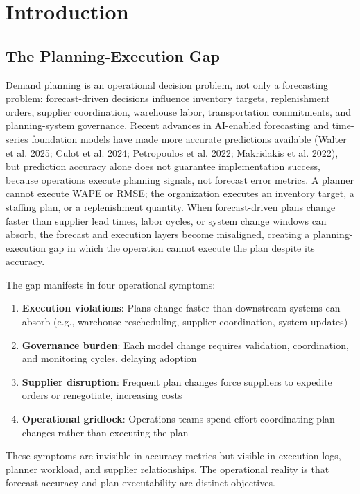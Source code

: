 \section{Introduction}

\subsection{The Planning-Execution Gap}
\label{sec:gap}

Demand planning is an operational decision problem, not only a forecasting problem: forecast-driven decisions influence inventory targets, replenishment orders, supplier coordination, warehouse labor, transportation commitments, and planning-system governance. Recent advances in AI-enabled forecasting and time-series foundation models have made more accurate predictions available (Walter et al. 2025; Culot et al. 2024; Petropoulos et al. 2022; Makridakis et al. 2022), but prediction accuracy alone does not guarantee implementation success, because operations execute planning signals, not forecast error metrics. A planner cannot execute WAPE or RMSE; the organization executes an inventory target, a staffing plan, or a replenishment quantity. When forecast-driven plans change faster than supplier lead times, labor cycles, or system change windows can absorb, the forecast and execution layers become misaligned, creating a planning-execution gap in which the operation cannot execute the plan despite its accuracy.

The gap manifests in four operational symptoms:
\begin{enumerate}
\item \textbf{Execution violations}: Plans change faster than downstream systems can absorb (e.g., warehouse rescheduling, supplier coordination, system updates)
\item \textbf{Governance burden}: Each model change requires validation, coordination, and monitoring cycles, delaying adoption
\item \textbf{Supplier disruption}: Frequent plan changes force suppliers to expedite orders or renegotiate, increasing costs
\item \textbf{Operational gridlock}: Operations teams spend effort coordinating plan changes rather than executing the plan
\end{enumerate}

These symptoms are invisible in accuracy metrics but visible in execution logs, planner workload, and supplier relationships. The operational reality is that forecast accuracy and plan executability are distinct objectives.

